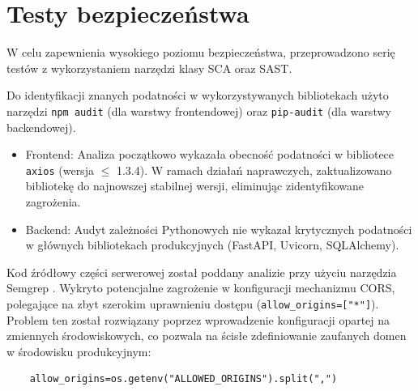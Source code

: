 \section{Testy bezpieczeństwa}
W celu zapewnienia wysokiego poziomu bezpieczeństwa, przeprowadzono serię testów z wykorzystaniem narzędzi klasy \gls{SCA} oraz \gls{SAST}.

Do identyfikacji znanych podatności w wykorzystywanych bibliotekach użyto narzędzi \texttt{npm audit} (dla warstwy frontendowej) oraz \texttt{pip-audit} (dla warstwy backendowej).

\begin{itemize}
    \item Frontend: Analiza początkowo wykazała obecność podatności w bibliotece \texttt{axios} (wersja $\le$ 1.3.4). W ramach działań naprawczych, zaktualizowano bibliotekę do najnowszej stabilnej wersji, eliminując zidentyfikowane zagrożenia.
    \item Backend: Audyt zależności Pythonowych nie wykazał krytycznych podatności w głównych bibliotekach produkcyjnych (FastAPI, Uvicorn, SQLAlchemy).
\end{itemize}

Kod źródłowy części serwerowej został poddany analizie przy użyciu narzędzia Semgrep \cite{semgrep}.
Wykryto potencjalne zagrożenie w konfiguracji mechanizmu \gls{CORS}, polegające na zbyt szerokim uprawnieniu dostępu (\texttt{allow\_origins=["*"]}).
Problem ten został rozwiązany poprzez wprowadzenie konfiguracji opartej na zmiennych środowiskowych, co pozwala na ścisłe zdefiniowanie zaufanych domen w środowisku produkcyjnym:
\begin{verbatim}
    allow_origins=os.getenv("ALLOWED_ORIGINS").split(",")
\end{verbatim}


